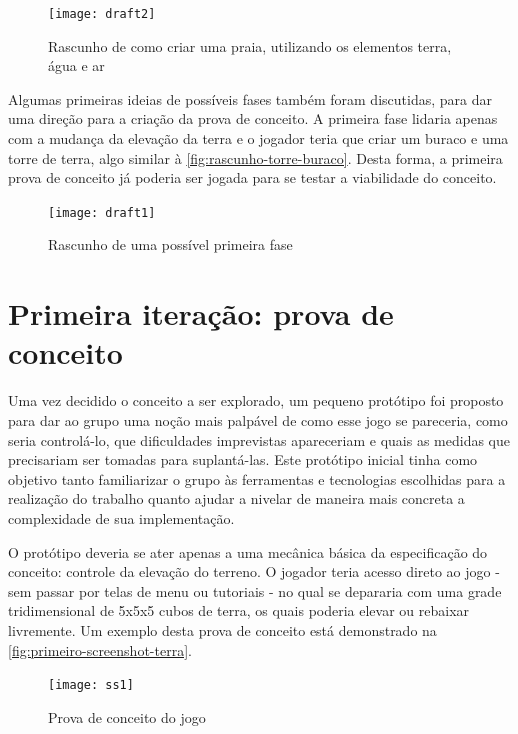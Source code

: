 \begin{figure}[htb]
	\centering
	\caption{Rascunho de como criar uma praia, utilizando os elementos terra, água e ar}
	\texttt{[image: draft2]}
	\legend{\fonteAP}
	\label{fig:rascunhos-praia}
\end{figure}

Algumas primeiras ideias de possíveis fases também foram discutidas, para 
dar uma direção para a criação da prova de conceito. A primeira fase lidaria 
apenas com a mudança da elevação da terra e o jogador teria que criar um 
buraco e uma torre de terra, algo similar à \autoref{fig:rascunho-torre-buraco}.
Desta forma, a primeira prova de conceito já poderia ser jogada 
para se testar a viabilidade do conceito.

\begin{figure}[h]
	\centering
	\caption{Rascunho de uma possível primeira fase}
	\texttt{[image: draft1]}
	\legend{\fonteAP}
	\label{fig:rascunho-torre-buraco}
\end{figure}

\section{Primeira iteração: prova de conceito}\label{sec-primeira-iteracao-prova-conceito}

Uma vez decidido o conceito a ser explorado, um pequeno protótipo foi proposto 
para dar ao grupo uma noção mais palpável de como esse jogo se pareceria, como 
seria controlá-lo, que dificuldades imprevistas apareceriam e quais as medidas 
que precisariam ser tomadas para suplantá-las. Este protótipo inicial tinha 
como objetivo tanto familiarizar o grupo às ferramentas e tecnologias 
escolhidas para a realização do trabalho quanto ajudar a nivelar de maneira 
mais concreta a complexidade de sua implementação.

O protótipo deveria se ater apenas a uma mecânica básica da especificação 
do conceito: controle da elevação do terreno. O jogador teria acesso direto ao 
jogo - sem passar por telas de menu ou tutoriais - no qual se depararia com 
uma grade tridimensional de 5x5x5 cubos de terra, os quais poderia elevar 
ou rebaixar livremente. Um exemplo desta prova de conceito está 
demonstrado na \autoref{fig:primeiro-screenshot-terra}.

\begin{figure}[h]
	\centering
	\caption{Prova de conceito do jogo}
	\texttt{[image: ss1]}
	\legend{\fonteAP}
	\label{fig:primeiro-screenshot-terra}
\end{figure}

